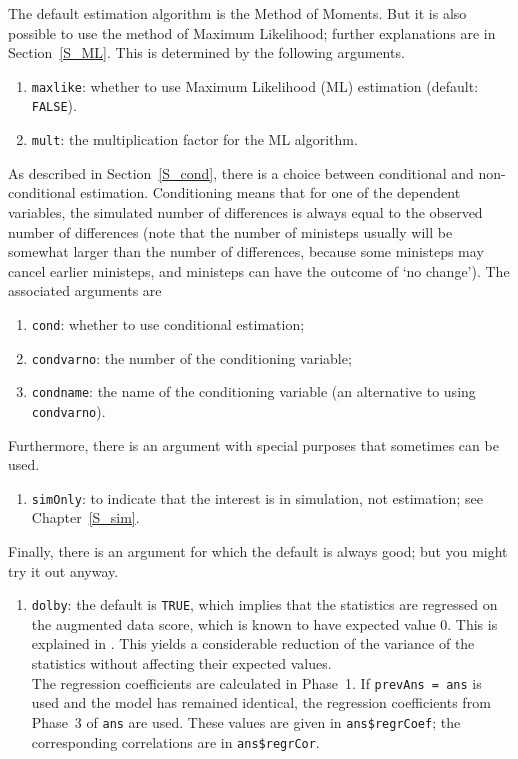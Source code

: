 \documentclass[a4paper,fleqn,11pt]{article}
\newcommand{\+}{\, + \,}
\begin{document}
The default estimation algorithm is the Method of Moments. But it is also possible
to use the method of Maximum Likelihood; further explanations are in Section~\ref{S_ML}.
This is determined by the following arguments.
\begin{enumerate}[resume]
  \item \texttt{maxlike}: whether to use Maximum Likelihood (ML) estimation
       (default: \texttt{FALSE}).
  \item \texttt{mult}: the multiplication factor for the ML algorithm.
\end{enumerate}
As described in Section~\ref{S_cond}, there is a choice between conditional
and non-conditional estimation. Conditioning means that for one of the
dependent variables, the simulated number of differences is always equal to
the observed number of differences (note that the number of ministeps usually will
be somewhat larger than the number of differences, because some ministeps
may cancel earlier ministeps, and ministeps can have the outcome of
`no change'). The associated arguments are
\begin{enumerate}[resume]
  \item \texttt{cond}: whether to use conditional estimation;
  \item \texttt{condvarno}: the number of the conditioning variable;
  \item \texttt{condname}: the name of the conditioning variable (an alternative
      to using \texttt{condvarno}).
\end{enumerate}
Furthermore, there is an argument with special purposes that sometimes
can be used.
\begin{enumerate}[resume]
  \item \texttt{simOnly}: to indicate that the interest is in simulation,
       not estimation; see Chapter~\ref{S_sim}.
\end{enumerate}
Finally, there is an argument for which the default is always good;
but you might try it out anyway.
\begin{enumerate}[resume]
  \item \texttt{dolby}: the default is \texttt{TRUE}, which implies that the
   statistics are regressed on the augmented data score, which is known to have
   expected value 0. This is explained in \citet{Snijders2013Greenwich}.
   This yields a considerable reduction of the variance of the statistics
   without affecting their expected values.\\
   The regression coefficients are calculated in Phase~1.
   If \texttt{prevAns = ans} is used
   and the model has remained identical, the regression coefficients from
   Phase~3 of \texttt{ans} are used.
   These values are given in \texttt{ans\$regrCoef};
   the corresponding correlations are in \texttt{ans\$regrCor}.

\end{enumerate}
\end{document}
